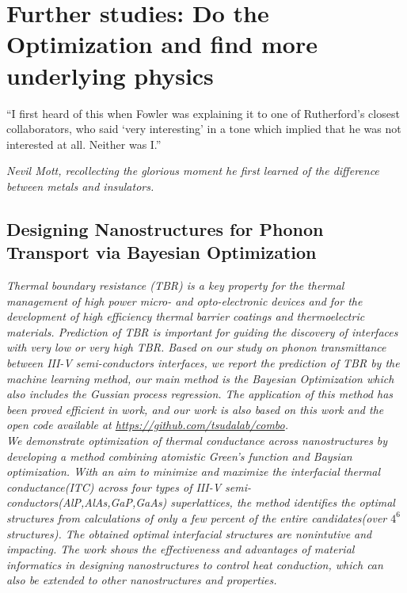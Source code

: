 
\chapter{Further studies: Do the Optimization and find more underlying physics}  %

\graphicspath{{Chapter4/}}


\setlength{\epigraphwidth}{0.6\textwidth}
\epigraph{“I first heard of this when Fowler was explaining it to one of Rutherford’s closest collaborators, who said ‘very interesting’ in a tone which implied that he was not interested at all. Neither was I.”}
{\textit{Nevil Mott, recollecting the glorious moment he first learned of the difference between metals and insulators.}}
\section[The Bayesian Optimization on ITC]{Designing Nanostructures for Phonon Transport via Bayesian Optimization}
\textit{Thermal boundary resistance (TBR) is a key property for the thermal management of high power
micro- and opto-electronic devices and for the development of high efficiency thermal barrier coatings
and thermoelectric materials. Prediction of TBR is important for guiding the discovery of interfaces
with very low or very high TBR. Based on our study on phonon transmittance between III-V semi-conductors interfaces, we report the prediction of TBR by the machine learning method, our main method is the Bayesian Optimization which also includes the Gussian process regression. The application of this method has been proved efficient in work\cite{ueno2016combo}, and our work is also based on this work and the open code available at \url{https://github.com/tsudalab/combo}. }\\
\textit{We demonstrate optimization of thermal conductance across nanostructures by developing a method combining atomistic Green's function and Baysian optimization. With an aim to minimize and maximize the interfacial thermal conductance(ITC) across four types of III-V semi-conductors(AlP,AlAs,GaP,GaAs) superlattices, the method identifies the optimal structures from calculations of only a few percent of the entire candidates(over $4^6$ structures). The obtained optimal interfacial structures are nonintutive and impacting. The work shows the effectiveness and advantages of material informatics in designing nanostructures to control heat conduction, which can also be extended to other nanostructures and properties\cite{ju2017designing}.}
